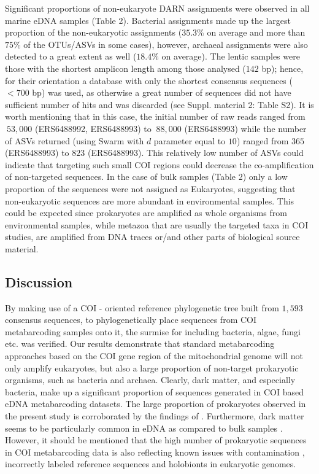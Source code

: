    Significant proportions of non-eukaryote DARN assignments were observed in all marine eDNA samples (Table 2). 
   Bacterial assignments made up the largest proportion of the non-eukaryotic assignments 
   ($35.3\%$ on average and more than $75\%$ of the OTUs/ASVs in some cases), however, archaeal assignments 
   were also detected to a great extent as well ($18.4\%$ on average). 
   The lentic samples were those with the shortest amplicon length among those analysed ($142$ bp); 
   hence, for their orientation a database with only the shortest consensus sequences ($<700$ bp) was used, as otherwise a great number of sequences did not have sufficient number of hits and was discarded (see Suppl. material 2: Table S2). 
   It is worth mentioning that in this case, the initial number of raw reads ranged 
   from $~53,000$ (ERS6488992, ERS6488993) to $~88,000$ (ERS6488993) while the number of ASVs returned 
   (using Swarm with $d$ parameter equal to $10$) ranged from $365$ (ERS6488993) to $823$ (ERS6488993). 
   This relatively low number of ASVs could indicate that targeting such small COI regions could decrease the 
   co-amplification of non-targeted sequences. 
   In the case of bulk samples (Table 2) only a low proportion of the sequences were not assigned as Eukaryotes, suggesting that non-eukaryotic sequences are more abundant in environmental samples. 
   This could be expected since prokaryotes are amplified as whole organisms from environmental samples, while metazoa that are usually the targeted taxa in COI studies, are amplified from DNA traces or/and other parts of biological source material.



   \subsection{Discussion}

   By making use of a COI - oriented reference phylogenetic tree built from $1,593$ consensus sequences, to phylogenetically place sequences from COI metabarcoding samples onto it, the surmise for including bacteria, algae, fungi etc. \citep{yang2013testing, aylagas2016benchmarking} was verified. 
   Our results demonstrate that standard metabarcoding approaches based on the COI gene region of the mitochondrial genome will not only amplify eukaryotes, but also a large proportion of non-target prokaryotic organisms, such as bacteria and archaea. 
   Clearly, dark matter, and especially bacteria, make up a significant proportion of sequences generated in COI based eDNA metabarcoding datasets. 
   The large proportion of prokaryotes observed in the present study is corroborated by the findings of \citep{yang2013testing}. 
   Furthermore, dark matter seems to be particularly common in eDNA as compared to bulk samples \citep{andujar2018coi}. 
   However, it should be mentioned that the high number of prokaryotic sequences in COI metabarcoding data is also reflecting known issues with contamination 
   \citep{kumar2013blobology, dittami2017detection, de2020contaminations}, 
   incorrectly labeled reference sequences \citep{steinegger2020terminating} and holobionts 
   \citep{gilbert2012symbiotic, salvucci2016microbiome} in eukaryotic genomes.

